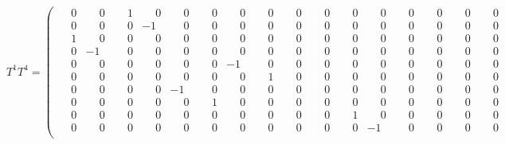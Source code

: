 \documentclass[10pt]{article}
\begin{document}
\[
T^{1}T^{4} = \left(\begin{smallmatrix}
\phantom{-}0 & \phantom{-}0 & \phantom{-}1 & \phantom{-}0 & \phantom{-}0 & \phantom{-}0 & \phantom{-}0 & \phantom{-}0 & \phantom{-}0 & \phantom{-}0 & \phantom{-}0 & \phantom{-}0 & \phantom{-}0 & \phantom{-}0 & \phantom{-}0 & \phantom{-}0 \\
\phantom{-}0 & \phantom{-}0 & \phantom{-}0 & -1 & \phantom{-}0 & \phantom{-}0 & \phantom{-}0 & \phantom{-}0 & \phantom{-}0 & \phantom{-}0 & \phantom{-}0 & \phantom{-}0 & \phantom{-}0 & \phantom{-}0 & \phantom{-}0 & \phantom{-}0 \\
\phantom{-}1 & \phantom{-}0 & \phantom{-}0 & \phantom{-}0 & \phantom{-}0 & \phantom{-}0 & \phantom{-}0 & \phantom{-}0 & \phantom{-}0 & \phantom{-}0 & \phantom{-}0 & \phantom{-}0 & \phantom{-}0 & \phantom{-}0 & \phantom{-}0 & \phantom{-}0 \\
\phantom{-}0 & -1 & \phantom{-}0 & \phantom{-}0 & \phantom{-}0 & \phantom{-}0 & \phantom{-}0 & \phantom{-}0 & \phantom{-}0 & \phantom{-}0 & \phantom{-}0 & \phantom{-}0 & \phantom{-}0 & \phantom{-}0 & \phantom{-}0 & \phantom{-}0 \\
\phantom{-}0 & \phantom{-}0 & \phantom{-}0 & \phantom{-}0 & \phantom{-}0 & \phantom{-}0 & -1 & \phantom{-}0 & \phantom{-}0 & \phantom{-}0 & \phantom{-}0 & \phantom{-}0 & \phantom{-}0 & \phantom{-}0 & \phantom{-}0 & \phantom{-}0 \\
\phantom{-}0 & \phantom{-}0 & \phantom{-}0 & \phantom{-}0 & \phantom{-}0 & \phantom{-}0 & \phantom{-}0 & \phantom{-}1 & \phantom{-}0 & \phantom{-}0 & \phantom{-}0 & \phantom{-}0 & \phantom{-}0 & \phantom{-}0 & \phantom{-}0 & \phantom{-}0 \\
\phantom{-}0 & \phantom{-}0 & \phantom{-}0 & \phantom{-}0 & -1 & \phantom{-}0 & \phantom{-}0 & \phantom{-}0 & \phantom{-}0 & \phantom{-}0 & \phantom{-}0 & \phantom{-}0 & \phantom{-}0 & \phantom{-}0 & \phantom{-}0 & \phantom{-}0 \\
\phantom{-}0 & \phantom{-}0 & \phantom{-}0 & \phantom{-}0 & \phantom{-}0 & \phantom{-}1 & \phantom{-}0 & \phantom{-}0 & \phantom{-}0 & \phantom{-}0 & \phantom{-}0 & \phantom{-}0 & \phantom{-}0 & \phantom{-}0 & \phantom{-}0 & \phantom{-}0 \\
\phantom{-}0 & \phantom{-}0 & \phantom{-}0 & \phantom{-}0 & \phantom{-}0 & \phantom{-}0 & \phantom{-}0 & \phantom{-}0 & \phantom{-}0 & \phantom{-}0 & \phantom{-}1 & \phantom{-}0 & \phantom{-}0 & \phantom{-}0 & \phantom{-}0 & \phantom{-}0 \\
\phantom{-}0 & \phantom{-}0 & \phantom{-}0 & \phantom{-}0 & \phantom{-}0 & \phantom{-}0 & \phantom{-}0 & \phantom{-}0 & \phantom{-}0 & \phantom{-}0 & \phantom{-}0 & -1 & \phantom{-}0 & \phantom{-}0 & \phantom{-}0 & \phantom{-}0 \\

\end{smallmatrix}\]
\end{document}
